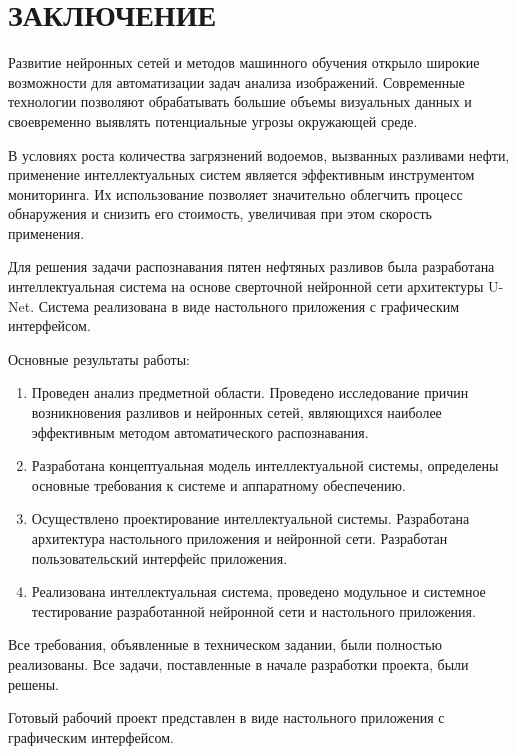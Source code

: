 \section*{ЗАКЛЮЧЕНИЕ}

Развитие нейронных сетей и методов машинного обучения открыло широкие возможности для автоматизации задач анализа изображений. Современные технологии позволяют обрабатывать большие объемы визуальных данных и своевременно выявлять потенциальные угрозы окружающей среде.

В условиях роста количества загрязнений водоемов, вызванных разливами нефти, применение интеллектуальных систем является эффективным инструментом мониторинга. Их использование позволяет значительно облегчить процесс обнаружения и снизить его стоимость, увеличивая при этом скорость применения.

Для решения задачи распознавания пятен нефтяных разливов была разработана интеллектуальная система на основе сверточной нейронной сети архитектуры U-Net. Система реализована в виде настольного приложения с графическим интерфейсом.

Основные результаты работы:

\begin{enumerate}
\item Проведен анализ предметной области. Проведено исследование причин возникновения разливов и нейронных сетей, являющихся наиболее эффективным методом автоматического распознавания.
\item Разработана концептуальная модель интеллектуальной системы, определены основные требования к системе и аппаратному обеспечению.
\item Осуществлено проектирование интеллектуальной системы. Разработана архитектура настольного приложения и нейронной сети. Разработан пользовательский интерфейс приложения.
\item Реализована интеллектуальная система, проведено модульное и системное тестирование разработанной нейронной сети и настольного приложения.
\end{enumerate}

Все требования, объявленные в техническом задании, были полностью реализованы. Все задачи, поставленные в начале разработки проекта, были решены.

Готовый рабочий проект представлен в виде настольного приложения с графическим интерфейсом.
